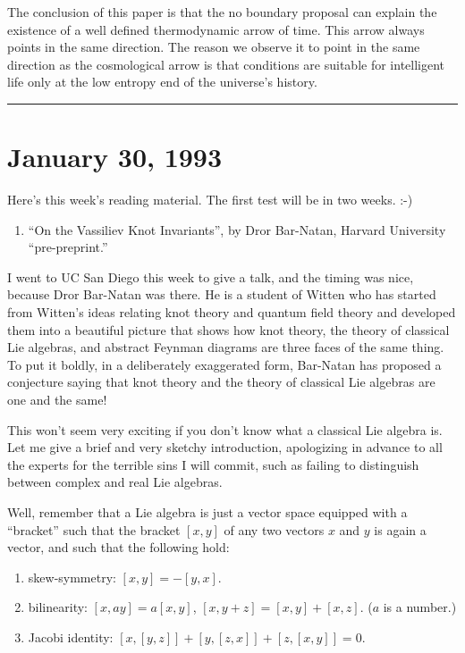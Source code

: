 \documentclass{article}
\def\tightlist{}
\begin{document}
The conclusion of this paper is that the no boundary proposal can
explain the existence of a well defined thermodynamic arrow of time.
This arrow always points in the same direction. The reason we observe it
to point in the same direction as the cosmological arrow is that
conditions are suitable for intelligent life only at the low entropy end
of the universe's history.

\begin{center}\rule{0.5\linewidth}{0.5pt}\end{center}
\hypertarget{week3}{%
\section{January 30, 1993}\label{week3}}

Here's this week's reading material. The first test will be in two
weeks. :-)

\begin{enumerate}
\def\labelenumi{\arabic{enumi})}
\tightlist
\item
  ``On the Vassiliev Knot Invariants'', by Dror Bar-Natan, Harvard
  University ``pre-preprint.''
\end{enumerate}

I went to UC San Diego this week to give a talk, and the timing was
nice, because Dror Bar-Natan was there. He is a student of Witten who
has started from Witten's ideas relating knot theory and quantum field
theory and developed them into a beautiful picture that shows how knot
theory, the theory of classical Lie algebras, and abstract Feynman
diagrams are three faces of the same thing. To put it boldly, in a
deliberately exaggerated form, Bar-Natan has proposed a conjecture
saying that knot theory and the theory of classical Lie algebras are one
and the same!

This won't seem very exciting if you don't know what a classical Lie
algebra is. Let me give a brief and very sketchy introduction,
apologizing in advance to all the experts for the terrible sins I will
commit, such as failing to distinguish between complex and real Lie
algebras.

Well, remember that a Lie algebra is just a vector space equipped with a
``bracket'' such that the bracket \([x,y]\) of any two vectors \(x\) and
\(y\) is again a vector, and such that the following hold:

\begin{enumerate}
\def\labelenumi{\alph{enumi})}
\tightlist
\item
  skew-symmetry: \([x,y] = -[y,x]\).
\item
  bilinearity: \([x,ay] = a[x,y]\), \([x,y+z] = [x,y] + [x,z]\). (\(a\)
  is a number.)
\item
  Jacobi identity: \([x,[y,z]] + [y,[z,x]] + [z,[x,y]] = 0\).
\end{enumerate}
\end{document}
